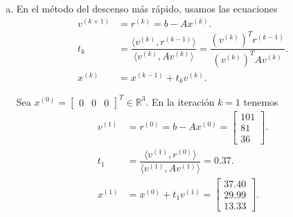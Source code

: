 \begin{frame}
	\begin{solution}
		\begin{enumerate}[b)]
			\item

			      En el método del descenso más rápido, usamos las
			      ecuaciones
			      \begin{align*}
				      v^{\left(k+1\right)} & =
				      r^{\left(k\right)}=
				      b-Ax^{\left(k\right)}.   \\
				      t_{k}                & =
				      \dfrac{
					      \langle
					      v^{\left(k\right)},
					      r^{\left(k-1\right)}
					      \rangle
				      }{
					      \langle
					      v^{\left(k\right)},
					      Av^{\left(k\right)}
					      \rangle
				      }=
				      \dfrac{
				      \left(v^{\left(k\right)}\right)^{T}r^{\left(k-1\right)}
				      }{
				      \left(v^{\left(k\right)}\right)^{T}Av^{\left(k\right)}
				      }.                       \\
				      x^{\left(k\right)}   & =
				      x^{\left(k-1\right)}+
				      t_{k}v^{\left(k\right)}.
			      \end{align*}

			      Sea
			      \begin{math}
				      x^{\left(0\right)}=
					      {\begin{bmatrix}
							      0 & 0 & 0
						      \end{bmatrix}}^{T}
				      \in\mathbb{R}^{3}
			      \end{math}.
			      En la iteración $k=1$ tenemos
			      \begin{align*}
				      v^{\left(1\right)} & =
				      r^{\left(0\right)}=
				      b-Ax^{\left(0\right)}=
				      \begin{bmatrix}
					      101 \\
					      81  \\
					      36
				      \end{bmatrix}.         \\
				      t_{1}              & =
				      \dfrac{
					      \langle
					      v^{\left(1\right)},
					      r^{\left(0\right)}
					      \rangle
				      }{
					      \langle
					      v^{\left(1\right)},
					      Av^{\left(1\right)}
					      \rangle
				      }
				      =
				      0.37.                  \\
				      x^{\left(1\right)} & =
				      x^{\left(0\right)}+
				      t_{1}v^{\left(1\right)}=
				      \begin{bmatrix}
					      37.40 \\
					      29.99 \\
					      13.33
				      \end{bmatrix}.
			      \end{align*}


\end{enumerate}
\end{solution}
\end{frame}
